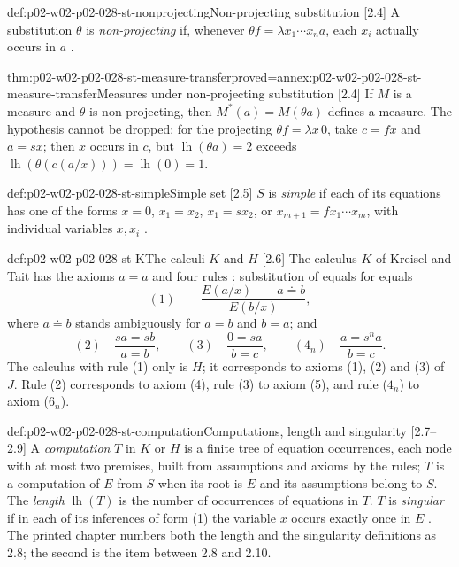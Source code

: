 \begin{hbdefinition}{def:p02-w02-p02-028-st-nonprojecting}{Non-projecting substitution [2.4]}
A substitution \(\theta\) is \emph{non-projecting} if, whenever
\(\theta f=\lambda x_1\cdots x_na\), each \(x_i\) actually occurs in \(a\)
\cite[\S2.4, p.~901]{Statman1977}.
\end{hbdefinition}

\begin{hblemma}{thm:p02-w02-p02-028-st-measure-transfer}{proved=annex:p02-w02-p02-028-st-measure-transfer}{Measures under non-projecting substitution [2.4]}
If \(M\) is a measure and \(\theta\) is non-projecting, then
\(M^*(a)=M(\theta a)\) defines a measure.  The hypothesis cannot be dropped:
for the projecting \(\theta f=\lambda x\,0\), take \(c=fx\) and \(a=sx\); then
\(x\) occurs in \(c\), but \(\operatorname{lh}(\theta a)=2\) exceeds
\(\operatorname{lh}(\theta(c(a/x)))=\operatorname{lh}(0)=1\).
\end{hblemma}

\begin{hbdefinition}{def:p02-w02-p02-028-st-simple}{Simple set [2.5]}
\(S\) is \emph{simple} if each of its equations has one of the forms
\(x=0\), \(x_1=x_2\), \(x_1=sx_2\), or \(x_{m+1}=fx_1\cdots x_m\), with
individual variables \(x,x_i\) \cite[\S2.5, p.~901]{Statman1977}.
\end{hbdefinition}

\begin{hbdefinition}{def:p02-w02-p02-028-st-K}{The calculi \(K\) and \(H\) [2.6]}
The calculus \(K\) of Kreisel and Tait has the axioms \(a=a\) and four rules
\cite[\S2.6, p.~902]{Statman1977}: substitution of equals for equals
\[
 (1)\qquad \frac{E(a/x)\qquad a\doteq b}{E(b/x)},
\]
where \(a\doteq b\) stands ambiguously for \(a=b\) and \(b=a\); and
\[
 (2)\quad\frac{sa=sb}{a=b},
 \qquad
 (3)\quad\frac{0=sa}{b=c},
 \qquad
 (4_n)\quad\frac{a=s^na}{b=c}.
\]
The calculus with rule (1) only is \(H\); it corresponds to axioms (1), (2)
and (3) of \(J\).  Rule (2) corresponds to axiom (4), rule (3) to axiom (5),
and rule (\(4_n\)) to axiom (\(6_n\)).
\end{hbdefinition}

\begin{hbdefinition}{def:p02-w02-p02-028-st-computation}{Computations, length and singularity [2.7--2.9]}
A \emph{computation} \(T\) in \(K\) or \(H\) is a finite tree of equation
occurrences, each node with at most two premises, built from assumptions and
axioms by the rules; \(T\) is a computation of \(E\) from \(S\) when its root
is \(E\) and its assumptions belong to \(S\).  The \emph{length}
\(\operatorname{lh}(T)\) is the number of occurrences of equations in \(T\).
\(T\) is \emph{singular} if in each of its inferences of form (1) the
variable \(x\) occurs exactly once in \(E\)
\cite[\S\S2.7--2.9, p.~902]{Statman1977}.  The printed chapter numbers both
the length and the singularity definitions as 2.8; the second is the item
between 2.8 and 2.10.
\end{hbdefinition}

